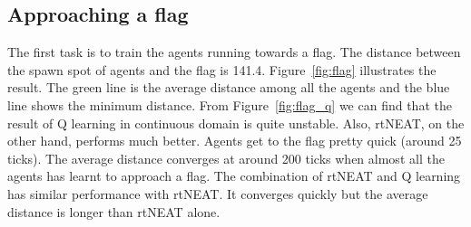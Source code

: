 \documentclass[letterpaper]{article}
\begin{document}
\subsection{Approaching a flag}
The first task is to train the agents running towards a flag. The distance between the spawn spot of agents and the flag is 141.4. Figure~\ref{fig:flag} illustrates the result. The green line is the average distance among all the agents and the blue line shows the minimum distance. From Figure~\ref{fig:flag_q} we can find that the result of Q learning in continuous domain is quite unstable. Also, rtNEAT, on the other hand, performs much better. Agents get to the flag pretty quick (around 25 ticks). The average distance converges at around 200 ticks when almost all the agents has learnt to approach a flag. The combination of rtNEAT and Q learning has similar performance with rtNEAT. It converges quickly but the average distance is longer than rtNEAT alone. 
\end{document}
